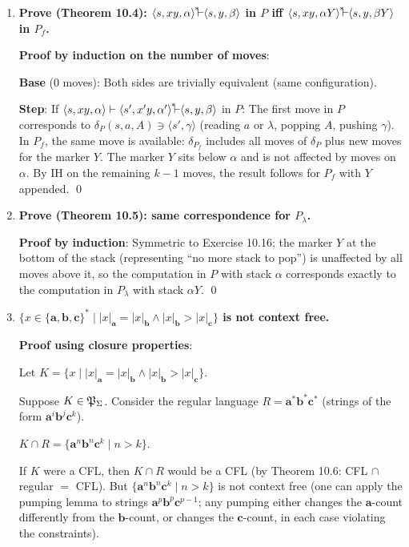 \begin{enumerate}[{10.}1. ]
\item \textbf{Prove (Theorem 10.4): $\langle s,xy,\alpha\rangle\Dvdash\langle s,y,\beta\rangle$ in $P$ iff $\langle s,xy,\alpha Y\rangle\Dvdash\langle s,y,\beta Y\rangle$ in $P_f$.}

\textbf{Proof by induction on the number of moves}:

\textbf{Base} (0 moves): Both sides are trivially equivalent (same configuration).

\textbf{Step}: If $\langle s,xy,\alpha\rangle\vdash\langle s',x'y,\alpha'\rangle\Dvdash\langle s,y,\beta\rangle$ in $P$:
The first move in $P$ corresponds to $\delta_P(s,a,A)\ni\langle s',\gamma\rangle$ (reading $a$ or $\lambda$, popping $A$, pushing $\gamma$). In $P_f$, the same move is available: $\delta_{P_f}$ includes all moves of $\delta_P$ plus new moves for the marker $Y$. The marker $Y$ sits below $\alpha$ and is not affected by moves on $\alpha$. By IH on the remaining $k-1$ moves, the result follows for $P_f$ with $Y$ appended. \qed

\item \textbf{Prove (Theorem 10.5): same correspondence for $P_\lambda$.}

\textbf{Proof by induction}: Symmetric to Exercise 10.16; the marker $Y$ at the bottom of the stack (representing ``no more stack to pop'') is unaffected by all moves above it, so the computation in $P$ with stack $\alpha$ corresponds exactly to the computation in $P_\lambda$ with stack $\alpha Y$. \qed

\item \textbf{$\{x\in\{\pmb{a},\pmb{b},\pmb{c}\}^* \mid |x|_{\pmb{a}}=|x|_{\pmb{b}}\wedge|x|_{\pmb{b}}>|x|_{\pmb{c}}\}$ is not context free.}

\textbf{Proof using closure properties}:

Let $K = \{x \mid |x|_{\pmb{a}}=|x|_{\pmb{b}}\wedge|x|_{\pmb{b}}>|x|_{\pmb{c}}\}$.

Suppose $K \in \mathfrak{P}_\Sigma$. Consider the regular language $R = \pmb{a}^*\pmb{b}^*\pmb{c}^*$ (strings of the form $\pmb{a}^i\pmb{b}^j\pmb{c}^k$).

$K \cap R = \{\pmb{a}^n\pmb{b}^n\pmb{c}^k \mid n>k\}$.

If $K$ were a CFL, then $K \cap R$ would be a CFL (by Theorem 10.6: CFL $\cap$ regular $=$ CFL). But $\{\pmb{a}^n\pmb{b}^n\pmb{c}^k \mid n>k\}$ is not context free (one can apply the pumping lemma to strings $\pmb{a}^p\pmb{b}^p\pmb{c}^{p-1}$; any pumping either changes the $\pmb{a}$-count differently from the $\pmb{b}$-count, or changes the $\pmb{c}$-count, in each case violating the constraints).


\end{enumerate}
